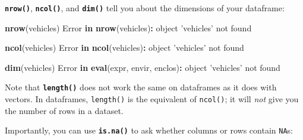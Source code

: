 \documentclass[]{book}
\newenvironment{Shaded}{\begin{snugshade}}{\end{snugshade}}
\newcommand{\CommentTok}[1]{\textcolor[rgb]{0.56,0.35,0.01}{\textit{#1}}}
\newcommand{\ControlFlowTok}[1]{\textcolor[rgb]{0.13,0.29,0.53}{\textbf{#1}}}
\newcommand{\KeywordTok}[1]{\textcolor[rgb]{0.13,0.29,0.53}{\textbf{#1}}}
\newcommand{\NormalTok}[1]{#1}
\newcommand{\OperatorTok}[1]{\textcolor[rgb]{0.81,0.36,0.00}{\textbf{#1}}}
\newcommand{\StringTok}[1]{\textcolor[rgb]{0.31,0.60,0.02}{#1}}
\begin{document}
\textbf{\texttt{nrow()}}, \textbf{\texttt{ncol()}}, and \textbf{\texttt{dim()}} tell you about the dimensions of your dataframe:

\begin{Shaded}
\begin{Highlighting}[]
\KeywordTok{nrow}\NormalTok{(vehicles) }
\NormalTok{Error }\ControlFlowTok{in} \KeywordTok{nrow}\NormalTok{(vehicles)}\OperatorTok{:}\StringTok{ }\NormalTok{object }\StringTok{'vehicles'}\NormalTok{ not found}
\end{Highlighting}
\end{Shaded}

\begin{Shaded}
\begin{Highlighting}[]
\KeywordTok{ncol}\NormalTok{(vehicles) }
\NormalTok{Error }\ControlFlowTok{in} \KeywordTok{ncol}\NormalTok{(vehicles)}\OperatorTok{:}\StringTok{ }\NormalTok{object }\StringTok{'vehicles'}\NormalTok{ not found}
\end{Highlighting}
\end{Shaded}

\begin{Shaded}
\begin{Highlighting}[]
\KeywordTok{dim}\NormalTok{(vehicles) }
\NormalTok{Error }\ControlFlowTok{in} \KeywordTok{eval}\NormalTok{(expr, envir, enclos)}\OperatorTok{:}\StringTok{ }\NormalTok{object }\StringTok{'vehicles'}\NormalTok{ not found}
\end{Highlighting}
\end{Shaded}

Note that \textbf{\texttt{length()}} does not work the same on dataframes as it does with vectors. In dataframes, \texttt{length()} is the equivalent of \texttt{ncol()}; it will \emph{not} give you the number of rows in a dataset.

Importantly, you can use \textbf{\texttt{is.na()}} to ask whether columns or rows contain \texttt{NA}s:

\begin{Shaded}
\end{Shaded}
\end{document}
